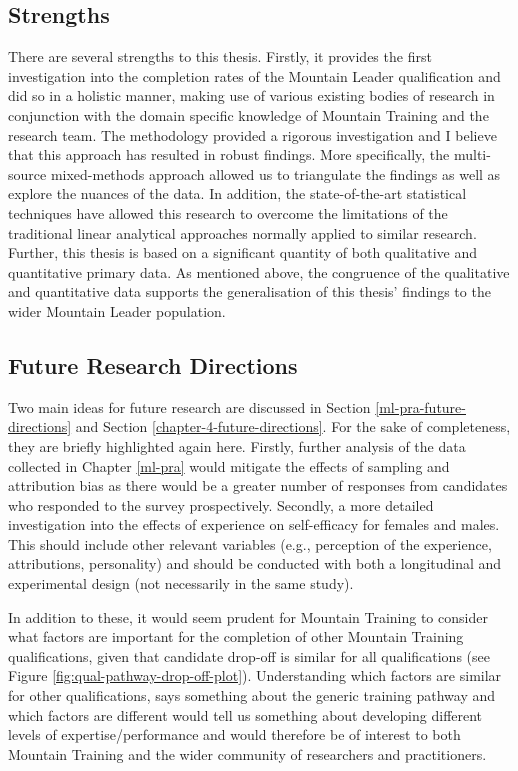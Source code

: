 \documentclass[
  12pt,
  a4paper,
]{book}
\begin{document}
\hypertarget{general-discussion-strengths}{%
\subsection{Strengths}\label{general-discussion-strengths}}

There are several strengths to this thesis. Firstly, it provides the first investigation into the completion rates of the Mountain Leader qualification and did so in a holistic manner, making use of various existing bodies of research in conjunction with the domain specific knowledge of Mountain Training and the research team. The methodology provided a rigorous investigation and I believe that this approach has resulted in robust findings. More specifically, the multi-source mixed-methods approach allowed us to triangulate the findings as well as explore the nuances of the data. In addition, the state-of-the-art statistical techniques have allowed this research to overcome the limitations of the traditional linear analytical approaches normally applied to similar research. Further, this thesis is based on a significant quantity of both qualitative and quantitative primary data. As mentioned above, the congruence of the qualitative and quantitative data supports the generalisation of this thesis' findings to the wider Mountain Leader population.

\hypertarget{future-research-directions}{%
\subsection{Future Research Directions}\label{future-research-directions}}

Two main ideas for future research are discussed in Section \ref{ml-pra-future-directions} and Section \ref{chapter-4-future-directions}. For the sake of completeness, they are briefly highlighted again here. Firstly, further analysis of the data collected in Chapter \ref{ml-pra} would mitigate the effects of sampling and attribution bias as there would be a greater number of responses from candidates who responded to the survey prospectively. Secondly, a more detailed investigation into the effects of experience on self-efficacy for females and males. This should include other relevant variables (e.g., perception of the experience, attributions, personality) and should be conducted with both a longitudinal and experimental design (not necessarily in the same study).

In addition to these, it would seem prudent for Mountain Training to consider what factors are important for the completion of other Mountain Training qualifications, given that candidate drop-off is similar for all qualifications (see Figure \ref{fig:qual-pathway-drop-off-plot}). Understanding which factors are similar for other qualifications, says something about the generic training pathway and which factors are different would tell us something about developing different levels of expertise/performance and would therefore be of interest to both Mountain Training and the wider community of researchers and practitioners.
\end{document}
